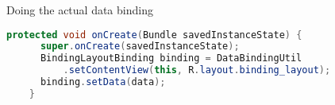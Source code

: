 \begin{frame}[fragile]{Doing the actual data binding}
  \begin{lstlisting}[language=Java]
    protected void onCreate(Bundle savedInstanceState) {
      super.onCreate(savedInstanceState);
      BindingLayoutBinding binding = DataBindingUtil
          .setContentView(this, R.layout.binding_layout);
      binding.setData(data);
    }
  \end{lstlisting}
\end{frame}
